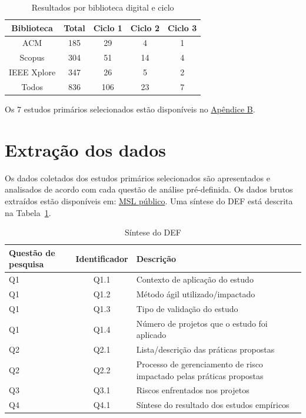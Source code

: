 \documentclass[
	12pt,
	openright,
	twoside,
	a4paper,
	english,
	brazil
	]{abntex2}
\begin{document}
\begin{table}[h!]
  \centering
  \caption{Resultados por biblioteca digital e ciclo}
  \begin{tabular}{|c|c|c|c|c|}
  \hline
  \textbf{Biblioteca} & \textbf{Total} & \textbf{Ciclo 1} & \textbf{Ciclo 2} & \textbf{Ciclo 3} \\ \hline
  ACM & 185 & 29 & 4 & 1 \\ \hline
  Scopus & 304 & 51 & 14 & 4 \\ \hline
  IEEE Xplore & 347 & 26 & 5 & 2 \\ \hline
  Todos & 836 & 106 & 23 & 7 \\ \hline
  \end{tabular}
\end{table}

Os 7 estudos primários selecionados estão disponíveis no \hyperref[apendiceB]{Apêndice B}.


\section{Extração dos dados}

Os dados coletados dos estudos primários selecionados são apresentados e analisados de acordo com cada questão de análise pré-definida. Os dados brutos extraídos estão disponíveis em: \href{https://docs.google.com/spreadsheets/d/1YY_yjyBefJ3ZmnEY38TM_LnZLoJcKhrw_q0BdEvqx2E/edit?gid=1276800509#gid=1276800509}{MSL público}. Uma síntese do DEF está descrita na Tabela~\ref{sintese}.

\begin{table}[H]
  \centering
  \caption{Síntese do DEF}
  \begin{tabular}{|p{2.4cm}|c|p{9.5cm}|}
  \hline
  \textbf{Questão de pesquisa} & \textbf{Identificador} & \textbf{Descrição} \\ \hline
  Q1 & Q1.1 & Contexto de aplicação do estudo \\ \hline
  Q1 & Q1.2 & Método ágil utilizado/impactado \\ \hline
  Q1 & Q1.3 & Tipo de validação do estudo \\ \hline
  Q1 & Q1.4 & Número de projetos que o estudo foi aplicado \\ \hline
  Q2 & Q2.1 & Lista/descrição das práticas propostas \\ \hline
  Q2 & Q2.2 & Processo de gerenciamento de risco impactado pelas práticas propostas \\ \hline
  Q3 & Q3.1 & Riscos enfrentados nos projetos \\ \hline
  Q4 & Q4.1 & Síntese do resultado dos estudos empíricos \\ \hline
  \end{tabular}
  \label{sintese}
\end{table}
\end{document}
